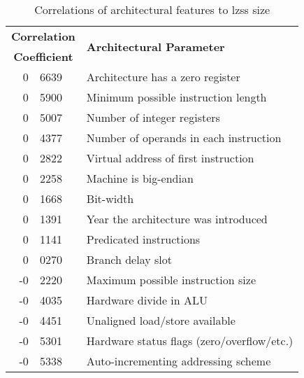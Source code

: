 \begin{table}[tbp]
\caption{Correlations of architectural features to lzss size}
\label{table:lzss_correlations}
\begin{sf} 
\begin{center}
\begin{tabular}{|r@{.\hspace{0.025em}}l|l|}
\hline
\multicolumn{2}{|c|}{\bf Correlation} & \multirow{2}{*}{\bf Architectural Parameter}\\
\multicolumn{2}{|c|}{\bf Coefficient} & \\
\hline
\hline

 0 & 6639	& Architecture has a zero register \\
 0 & 5900	& Minimum possible instruction length \\
 0 & 5007	& Number of integer registers \\
 0 & 4377	& Number of operands in each instruction \\
 0 & 2822	& Virtual address of first instruction \\ 
 0 & 2258	& Machine is big-endian \\
 0 & 1668	& Bit-width \\
 0 & 1391	& Year the architecture was introduced \\
 0 & 1141	& Predicated instructions \\
 0 & 0270	& Branch delay slot \\
 \hline
-0 & 2220	& Maximum possible instruction size  \\
-0 & 4035	& Hardware divide in ALU \\
-0 & 4451	& Unaligned load/store available \\
-0 & 5301	& Hardware status flags (zero/overflow/etc.) \\
-0 & 5338	& Auto-incrementing addressing scheme \\



\hline
\end{tabular}
\end{center}
\end{sf}


%
\end{table}
